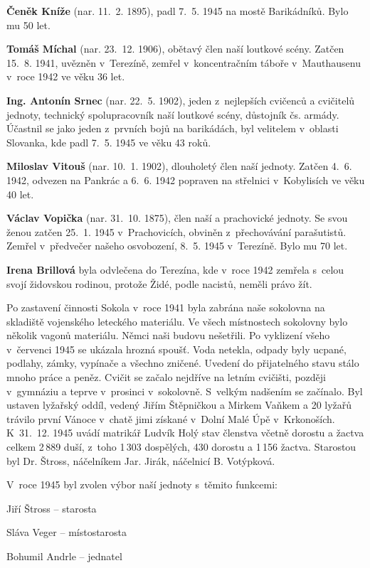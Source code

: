 \documentclass[a5paper, 11pt, twoside]{article}
\begin{document}
\textbf{Čeněk Kníže} (nar. 11.~2. 1895), padl 7.~5. 1945 na mostě
Barikádníků. Bylo mu 50 let.

\textbf{Tomáš Míchal} (nar. 23.~12. 1906), obětavý člen naší loutkové
scény. Zatčen 15.~8. 1941, uvězněn v~Terezíně, zemřel v~koncentračním
táboře v~Mauthausenu v~roce 1942 ve věku 36 let.

\textbf{Ing. Antonín Srnec} (nar. 22.~5. 1902), jeden z~nejlepších
cvičenců a cvičitelů jednoty, technický spolupracovník naší loutkové
scény, důstojník čs. armády. Účastnil se jako jeden z~prvních bojů na
barikádách, byl velitelem v~oblasti Slovanka, kde padl 7.~5. 1945 ve
věku 43 roků.

\textbf{Miloslav Vitouš} (nar. 10.~1. 1902), dlouholetý člen naší
jednoty. Zatčen 4.~6. 1942, odvezen na Pankrác a 6.~6. 1942 popraven na
střelnici v~Kobylisích ve věku 40 let.

\textbf{Václav Vopička} (nar. 31.~10. 1875), člen naší a prachovické
jednoty. Se svou ženou zatčen 25.~1. 1945 v~Prachovicích, obviněn
z~přechovávání parašutistů. Zemřel v~předvečer našeho osvobození, 8.~5.
1945 v~Terezíně. Bylo mu 70 let.

\textbf{Irena Brillová} byla odvlečena do Terezína, kde v~roce 1942
zemřela s~celou svojí židovskou rodinou, protože Židé, podle nacistů,
neměli právo žít.

Po zastavení činnosti Sokola v~roce 1941 byla zabrána naše sokolovna na
skladiště vojenského leteckého materiálu. Ve všech místnostech sokolovny
bylo několik vagonů materiálu. Němci naši budovu nešetřili. Po vyklizení
všeho v~červenci 1945 se ukázala hrozná spoušť. Voda netekla, odpady
byly ucpané, podlahy, zámky, vypínače a všechno zničené. Uvedení do
přijatelného stavu stálo mnoho práce a peněz. Cvičit se začalo nejdříve
na letním cvičišti, později v~gymnáziu a teprve v~prosinci v~sokolovně.
S~velkým nadšením se začínalo. Byl ustaven lyžařský oddíl, vedený Jiřím
Štěpničkou a Mirkem Vaňkem a 20 lyžařů trávilo první Vánoce v~chatě jimi
získané v~Dolní Malé Úpě v~Krkonoších. K~31.~12. 1945 uvádí matrikář
Ludvík Holý stav členstva včetně dorostu a žactva celkem 2\,889 duší,
z~toho 1\,303 dospělých, 430 dorostu a 1\,156 žactva. Starostou byl Dr.
Štross, náčelníkem Jar. Jirák, náčelnicí B. Votýpková.

V~roce 1945 byl zvolen výbor naší jednoty s~těmito funkcemi:

\medskip
Jiří Štross -- starosta

Sláva Veger -- místostarosta

Bohumil Andrle -- jednatel
\end{document}
